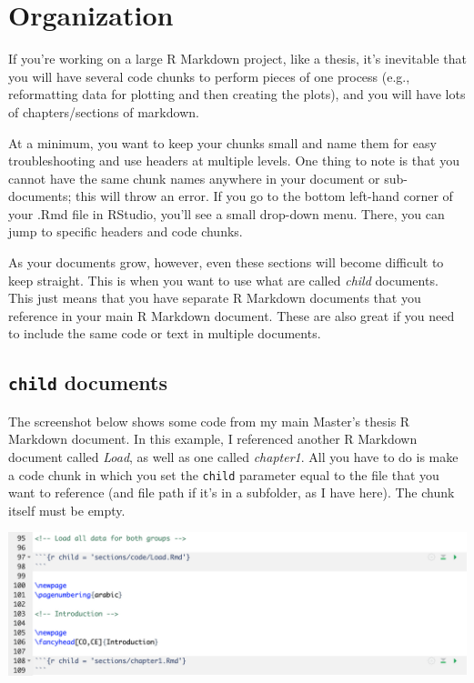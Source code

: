 \documentclass[
  openany]{book}
\begin{document}
\hypertarget{organization}{%
\chapter{Organization}\label{organization}}

If you're working on a large R Markdown project, like a thesis, it's inevitable that you will have several code chunks to perform pieces of one process (e.g., reformatting data for plotting and then creating the plots), and you will have lots of chapters/sections of markdown.

At a minimum, you want to keep your chunks small and name them for easy troubleshooting and use headers at multiple levels. One thing to note is that you cannot have the same chunk names anywhere in your document or sub-documents; this will throw an error. If you go to the bottom left-hand corner of your .Rmd file in RStudio, you'll see a small drop-down menu. There, you can jump to specific headers and code chunks.

As your documents grow, however, even these sections will become difficult to keep straight. This is when you want to use what are called \emph{child} documents. This just means that you have separate R Markdown documents that you reference in your main R Markdown document. These are also great if you need to include the same code or text in multiple documents.

\hypertarget{child-documents}{%
\section{\texorpdfstring{\texttt{child} documents}{child documents}}\label{child-documents}}

The screenshot below shows some code from my main Master's thesis R Markdown document. In this example, I referenced another R Markdown document called \emph{Load}, as well as one called \emph{chapter1}. All you have to do is make a code chunk in which you set the \texttt{child} parameter equal to the file that you want to reference (and file path if it's in a subfolder, as I have here). The chunk itself must be empty.

\includegraphics[width=\textwidth]{images/content_child_call}
\end{document}
